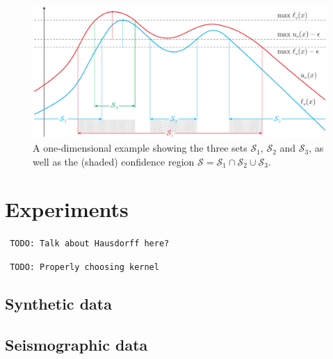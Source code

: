\documentclass[11pt]{article} %
\newcommand{\todo}[1]{\noindent\texttt{\color[rgb]{0.5,0.1,0.1} TODO: #1}}
\begin{document}
\begin{figure}[tb]
  \centering
  \includegraphics[width=\textwidth]{figures/cb_eps}
  \caption{A one-dimensional example showing the three sets $\mathcal{S}_1$,
           $\mathcal{S}_2$ and $\mathcal{S}_3$, as well as
           the (shaded) confidence region
           $\mathcal{S} = \mathcal{S}_1\cap\mathcal{S}_2\cup\mathcal{S}_3$.}
  \label{fig:cbe}
\end{figure}

\section{Experiments}

\todo{Talk about Hausdorff here?}

\todo{Properly choosing kernel}

\subsection{Synthetic data}

\subsection{Seismographic data}



\end{document}

